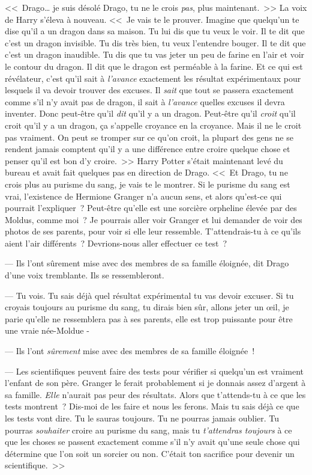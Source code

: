 <<~Drago… je suis désolé Drago, tu ne le crois \emph{pas}, plus maintenant.~>> La voix de Harry s'éleva à nouveau. <<~Je vais te le prouver. Imagine que quelqu'un te dise qu'il a un dragon dans sa maison. Tu lui dis que tu veux le voir. Il te dit que c'est un dragon invisible. Tu dis très bien, tu veux l'entendre bouger. Il te dit que c'est un dragon inaudible. Tu dis que tu vas jeter un peu de farine en l'air et voir le contour du dragon. Il dit que le dragon est perméable à la farine. Et ce qui est révélateur, c'est qu'il sait à \emph{l'avance} exactement les résultat expérimentaux pour lesquels il va devoir trouver des excuses. Il \emph{sait} que tout se passera exactement comme s'il n'y avait pas de dragon, il sait à \emph{l'avance} quelles excuses il devra inventer. Donc peut-être qu'il \emph{dit} qu'il y a un dragon. Peut-être qu'il \emph{croit} qu'il croit qu'il y a un dragon, ça s'appelle croyance en la croyance. Mais il ne le croit pas vraiment. On peut se tromper sur ce qu'on croit, la plupart des gens ne se rendent jamais comptent qu'il y a une différence entre croire quelque chose et penser qu'il est bon d'y croire.~>> Harry Potter s'était maintenant levé du bureau et avait fait quelques pas en direction de Drago. <<~Et Drago, tu ne crois plus au purisme du sang, je vais te le montrer. Si le purisme du sang est vrai, l'existence de Hermione Granger n'a aucun sens, et alors qu'est-ce qui pourrait l'expliquer~? Peut-être qu'elle est une sorcière orpheline élevée par des Moldus, comme moi~? Je pourrais aller voir Granger et lui demander de voir des photos de ses parents, pour voir si elle leur ressemble. T'attendrais-tu à ce qu'ils aient l'air différents~? Devrions-nous aller effectuer ce test~?

--- Ils l'ont sûrement mise avec des membres de sa famille éloignée, dit Drago d’une voix tremblante. Ils se ressembleront.

--- Tu vois. Tu sais déjà quel résultat expérimental tu vas devoir excuser. Si tu croyais toujours au purisme du sang, tu dirais bien sûr, allons jeter un œil, je parie qu'elle ne ressemblera pas à ses parents, elle est trop puissante pour être une vraie née-Moldue -

--- Ils l'ont \emph{sûrement} mise avec des membres de sa famille éloignée~!

--- Les scientifiques peuvent faire des tests pour vérifier si quelqu'un est vraiment l'enfant de son père. Granger le ferait probablement si je donnais assez d'argent à sa famille. \emph{Elle} n'aurait pas peur des résultats. Alors que t'attends-tu à ce que les tests montrent~? Dis-moi de les faire et nous les ferons. Mais tu sais déjà ce que les tests vont dire. Tu le sauras toujours. Tu ne pourras jamais oublier. Tu pourras \emph{souhaiter} croire au purisme du sang, mais tu \emph{t'attendras toujours} à ce que les choses se passent exactement comme s'il n'y avait qu'une seule chose qui détermine que l'on soit un sorcier ou non. C'était ton sacrifice pour devenir un scientifique.~>>

